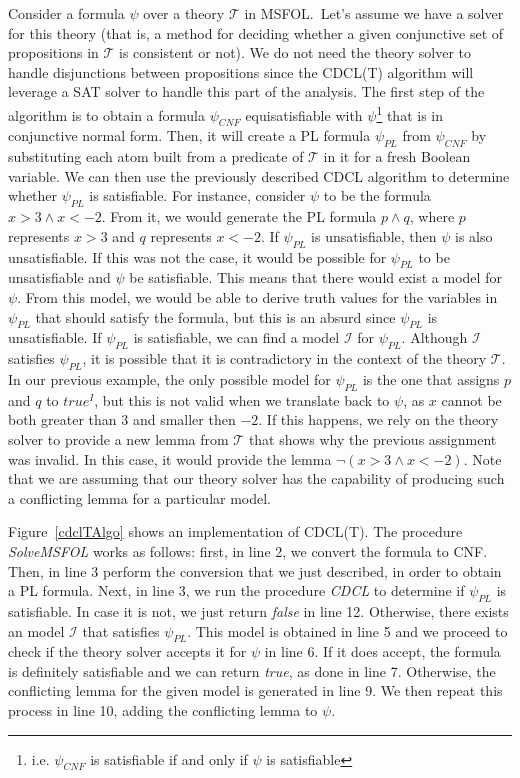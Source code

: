 Consider a formula $\psi$ over a theory $\mathcal{T}$ in MSFOL.\ Let's assume we have a solver for this theory (that is, a method for deciding whether a given conjunctive set of propositions in $\mathcal{T}$ is consistent or not). We do not need the theory solver to handle disjunctions between propositions since the CDCL(T) algorithm will leverage a SAT solver to handle this part of the analysis. The first step of the algorithm is to obtain a formula $\psi_{CNF}$ equisatisfiable with $\psi$\footnote{i.e. $\psi_{CNF}$ is satisfiable if and only if $\psi$ is satisfiable} that is in conjunctive normal form. Then, it will create a PL formula $\psi_{PL}$ from $\psi_{CNF}$ by substituting each atom built from a predicate of $\mathcal{T}$ in it for a fresh Boolean variable. We can then use the previously described CDCL algorithm to determine whether $\psi_{PL}$ is satisfiable. For instance, consider $\psi$ to be the formula $x > 3 \wedge x < -2$. From it, we would generate the PL formula $p \wedge q$, where $p$ represents $x > 3$ and $q$ represents $x < -2$. If $\psi_{PL}$ is unsatisfiable, then $\psi$ is also unsatisfiable. If this was not the case, it would be possible for $\psi_{PL}$ to be unsatisfiable and $\psi$ be satisfiable. This means that there would exist a model for $\psi$. From this model, we would be able to derive truth values for the variables in $\psi_{PL}$ that should satisfy the formula, but this is an absurd since $\psi_{PL}$ is unsatisfiable.
If $\psi_{PL}$ is satisfiable, we can find a model $\mathcal{I}$ for $\psi_{PL}$. Although $\mathcal{I}$ satisfies $\psi_{PL}$, it is possible that it is contradictory in the context of the theory $\mathcal{T}$. In our previous example,
the only possible model for $\psi_{PL}$ is the one that assigns $p$ and $q$ to $true^{I}$, but this is not valid when we translate back to $\psi$, as $x$ cannot be both greater than $3$ and smaller then $-2$.
 If this happens, we rely on the theory solver to provide a new lemma from $\mathcal{T}$ that shows why the previous assignment was invalid. In this case, it would provide the lemma $\neg (x > 3 \wedge x < -2)$. Note that we are assuming that our theory solver has the capability of producing such a conflicting lemma for a particular model.


Figure~\ref{cdclTAlgo} shows an implementation of CDCL(T). The procedure \textit{SolveMSFOL} works as follows: first, in line 2, we convert the formula to CNF. Then, in line 3 perform the conversion that we just described, in order to obtain a PL formula. Next, in line 3, we run the procedure \textit{CDCL} to determine if $\psi_{PL}$ is satisfiable. In case it is not, we just return \textit{false} in line 12. Otherwise, there exists an model $\mathcal{I}$ that satisfies $\psi_{PL}$. This model is obtained in line 5 and we proceed to check if the theory solver accepts it for $\psi$ in line 6. If it does accept, the formula is definitely satisfiable and we can return \textit{true}, as done in line 7. Otherwise, the conflicting lemma for the given model is generated in line 9. We then repeat this process in line 10, adding the conflicting lemma to $\psi$.

